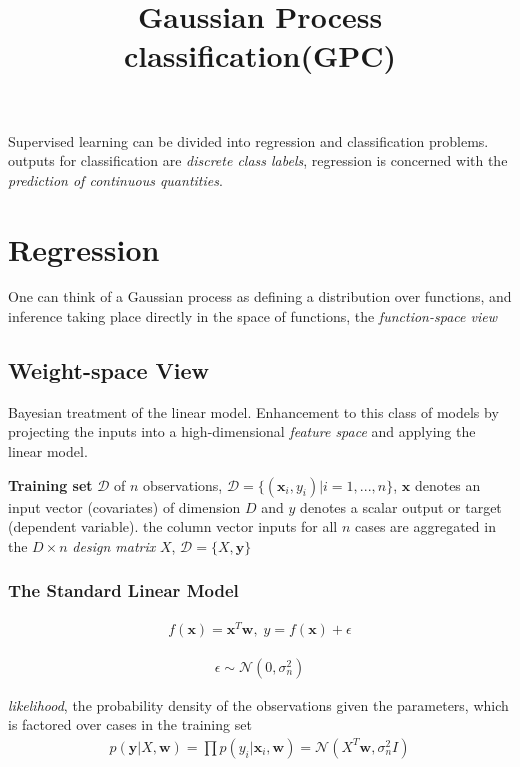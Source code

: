 \documentclass[a4paper]{article}
\begin{document}
\title{Gaussian Process classification(GPC)}
\author{}
\maketitle

Supervised learning can be divided into regression and classification problems. outputs for classification are \emph{discrete class labels}, regression is concerned with the \emph{prediction of continuous quantities}.

\section{Regression}
One can think of a Gaussian process as defining a distribution over functions, and inference taking place directly in the space of functions, the \emph{function-space view}

\subsection{Weight-space View}
Bayesian treatment of the linear model. Enhancement to this class of models by projecting the inputs into a high-dimensional \emph{feature space} and applying the linear model.

\textbf{Training set} $\mathcal{D}$ of $n$ observations, $\mathcal{D} = \{(\mathbf{x}_i, y_i)|i = 1,...,n\}$, $\mathbf{x}$ denotes an input vector (covariates) of dimension $D$ and $y$ denotes a scalar output or target (dependent variable). the column vector inputs for all $n$ cases are aggregated in the $D \times n$ \emph{design matrix} $X$, $\mathcal{D} = \{X,\mathbf{y}\}$

\subsubsection{The Standard Linear Model}

\begin{align}
  f(\mathbf{x}) = \mathbf{x}^T\mathbf{w},\;y = f(\mathbf{x}) + \epsilon
\end{align}

\begin{align}
  \epsilon \sim \mathcal{N}(0,\sigma_n^2)
\end{align}

\emph{likelihood}, the probability density of the observations given the parameters, which is factored over cases in the training set
\begin{align}
  p(\mathbf{y}|X,\mathbf{w}) = \prod p(y_i|\mathbf{x}_i,\mathbf{w}) = \mathcal{N}(X^T\mathbf{w},\sigma_n^2 I)
\end{align}
\end{document}
